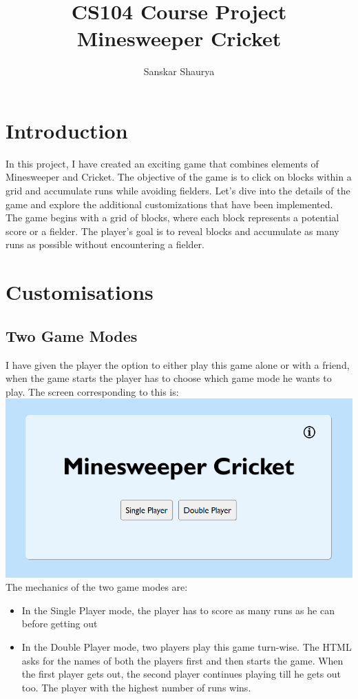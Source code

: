 \documentclass{article}
\begin{document}
\title{CS104 Course Project\protect\\ Minesweeper Cricket}
\author{Sanskar Shaurya}
\date{}
\maketitle

\tableofcontents
\clearpage

\section{Introduction}
In this project, I have created an exciting game that combines elements of Minesweeper and Cricket. The objective of the game is to click on blocks within a grid and accumulate runs while avoiding fielders. Let's dive into the details of the game and explore the additional customizations that have been implemented. The game begins with a grid of blocks, where each block represents a potential score or a fielder. The player's goal is to reveal blocks and accumulate as many runs as possible without encountering a fielder.


\section{Customisations}
\subsection{Two Game Modes}
I have given the player the option to either play this game alone or with a friend, when the game starts the player has to choose which game mode he wants to play. The screen corresponding to this is:
\newline
\newline
\includegraphics[width=\textwidth]{images/First Screen.png}
\newline
The mechanics of the two game modes are:
\begin{itemize}
    \item In the Single Player mode, the player has to score as many runs as he can before getting out
    \item In the Double Player mode, two players play this game turn-wise. The HTML asks for the names of both the players first and then starts the game. When the first player gets out, the second player continues playing till he gets out too. The player with the highest number of runs wins.
\end{itemize}
\end{document}
